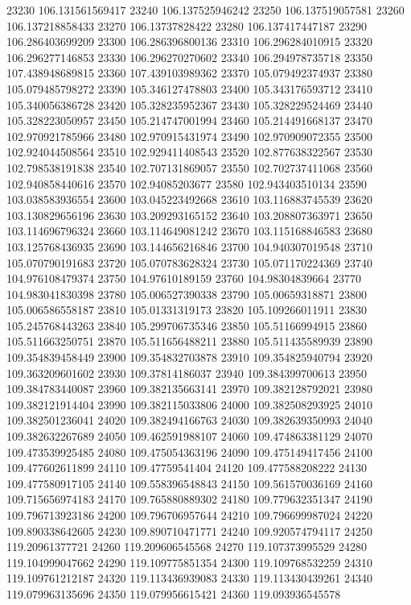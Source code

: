 {23230 106.131561569417
23240 106.137525946242
23250 106.137519057581
23260 106.137218858433
23270 106.13737828422
23280 106.137417447187
23290 106.286403699209
23300 106.286396800136
23310 106.296284010915
23320 106.296277146853
23330 106.296270270602
23340 106.294978735718
23350 107.438948689815
23360 107.439103989362
23370 105.079492374937
23380 105.079485798272
23390 105.346127478803
23400 105.343176593712
23410 105.340056386728
23420 105.328235952367
23430 105.328229524469
23440 105.328223050957
23450 105.214747001994
23460 105.214491668137
23470 102.970921785966
23480 102.970915431974
23490 102.970909072355
23500 102.924044508564
23510 102.929411408543
23520 102.877638322567
23530 102.798538191838
23540 102.707131869057
23550 102.702737411068
23560 102.940858440616
23570 102.94085203677
23580 102.943403510134
23590 103.038583936554
23600 103.045223492668
23610 103.116883745539
23620 103.130829656196
23630 103.209293165152
23640 103.208807363971
23650 103.114696796324
23660 103.114649081242
23670 103.115168846583
23680 103.125768436935
23690 103.144656216846
23700 104.940307019548
23710 105.070790191683
23720 105.070783628324
23730 105.071170224369
23740 104.976108479374
23750 104.97610189159
23760 104.98304839664
23770 104.983041830398
23780 105.006527390338
23790 105.00659318871
23800 105.006586558187
23810 105.01331319173
23820 105.109266011911
23830 105.245768443263
23840 105.299706735346
23850 105.51166994915
23860 105.511663250751
23870 105.511656488211
23880 105.511435589939
23890 109.354839458449
23900 109.354832703878
23910 109.354825940794
23920 109.363209601602
23930 109.37814186037
23940 109.384399700613
23950 109.384783440087
23960 109.382135663141
23970 109.382128792021
23980 109.382121914404
23990 109.382115033806
24000 109.382508293925
24010 109.382501236041
24020 109.382494166763
24030 109.382639350993
24040 109.382632267689
24050 109.462591988107
24060 109.474863381129
24070 109.473539925485
24080 109.475054363196
24090 109.475149417456
24100 109.477602611899
24110 109.47759541404
24120 109.477588208222
24130 109.477580917105
24140 109.558396548843
24150 109.561570036169
24160 109.715656974183
24170 109.765880889302
24180 109.779632351347
24190 109.796713923186
24200 109.796706957644
24210 109.796699987024
24220 109.890338642605
24230 109.890710471771
24240 109.920574794117
24250 119.20961377721
24260 119.209606545568
24270 119.107373995529
24280 119.104999047662
24290 119.109775851354
24300 119.109768532259
24310 119.109761212187
24320 119.113436939083
24330 119.113430439261
24340 119.079963135696
24350 119.079956615421
24360 119.093936545578
}
